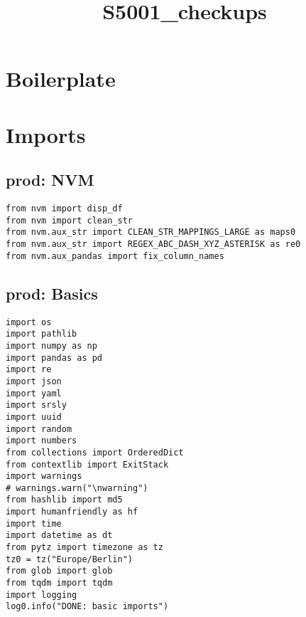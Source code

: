 \documentclass[a4paper,10pt,onecolumn,oneside,openright]{article}
\date{}
\title{S5001\_checkups}
\begin{document}
\maketitle


\section{Boilerplate}
\label{sec:org3bd780a}
\section{Imports}
\label{sec:orgaa572aa}
\subsection{prod: NVM}
\label{sec:orgb0e426a}
\begin{verbatim}
from nvm import disp_df
from nvm import clean_str
from nvm.aux_str import CLEAN_STR_MAPPINGS_LARGE as maps0
from nvm.aux_str import REGEX_ABC_DASH_XYZ_ASTERISK as re0
from nvm.aux_pandas import fix_column_names
\end{verbatim}

\subsection{prod: Basics}
\label{sec:orge6775c9}
\begin{verbatim}
import os
import pathlib
import numpy as np
import pandas as pd
import re
import json
import yaml
import srsly
import uuid
import random
import numbers
from collections import OrderedDict
from contextlib import ExitStack
import warnings
# warnings.warn("\nwarning")
from hashlib import md5
import humanfriendly as hf
import time
import datetime as dt
from pytz import timezone as tz
tz0 = tz("Europe/Berlin")
from glob import glob
from tqdm import tqdm
import logging
log0.info("DONE: basic imports")
\end{verbatim}
\end{document}
